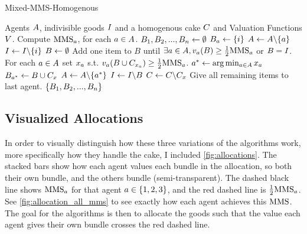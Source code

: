 \begin{algorithm}
    \caption{Mixed-MMS-Homogenous}\label{alg:mixed}
    \begin{algorithmic}[1]
        \Require Agents $A$, indivisible goods $I$ and a homogenous cake $C$ and Valuation Functions $V$.
        \State Compute $\text{MMS}_a$, for each $a\in A$.
        \State $B_1, B_2, ...,B_n\gets\emptyset$
        \label{line:mixed-phase1}
            \State $B_a\gets\{i\}$
            \State $A\gets A\backslash\{a\}$
            \State $I\gets I\backslash\{i\}$
        \EndWhile
        \label{line:mixed-phase2}
            \State $B\gets\emptyset$
            \State Add one item to $B$ until $\exists a\in A,v_a(B) \geq\frac{1}{2}\text{MMS}_a$ or $B=I$.
            \State For each $a\in A$ set $x_a$ s.t. $v_a(B\cup C_{x_a}) \geq \frac{1}{2}\text{MMS}_a$.
            \State $a^*\gets\arg\min_{a\in A}x_a$
            \State $B_{a^*}\gets B\cup C_x$
            \State $A\gets A\backslash\{a^*\}$
            \State $I\gets I\backslash B$
            \State $C\gets C\backslash C_x$
        \EndWhile
        \State Give all remaining items to last agent.\label{line:mixed-phase3}
        \State \Return $\{B_1, B_2, ...,B_n\}$
    \end{algorithmic}
\end{algorithm}





\subsection{Visualized Allocations}

In order to visually distinguish how these three variations of the algorithms work, more specifically how they handle the cake, I included \autoref{fig:allocations}. The stacked bars show how each agent values each bundle in the allocation, so both their own bundle, and the others bundle (semi-transparent). The dashed black line shows $\text{MMS}_a$ for that agent $a\in\{1,2,3\}$, and the red dashed line is $\frac{1}{2}\text{MMS}_a$. See \autoref{fig:allocation_all_mms} to see exactly how each agent achieves this $\text{MMS}$. The goal for the algorithms is then to allocate the goods such that the value each agent gives their own bundle crosses the red dashed line.

